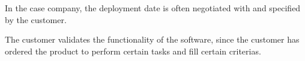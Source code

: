 \documentclass[english]{tktltiki2}
\theoremstyle{definition}
\theoremstyle{remark}
\begin{document}
In the case company, the deployment date is often negotiated with and specified by the customer. 

The customer validates the functionality of the software, since the customer has ordered the product to perform certain tasks and fill certain criterias. 






\end{document}
